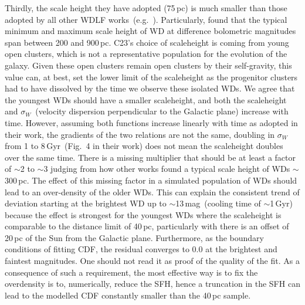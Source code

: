 \documentclass[fleqn,usenatbib]{mnras}
\begin{document}
Thirdly, the scale height they have adopted (75\,pc) is much smaller than those
adopted by all other WDLF works~(e.g.\ \citealt{2006AJ....131..571H,
2011MNRAS.417...93R, 2019MNRAS.482..715L}). Particularly,
\citet{2006AJ....131..571H} found that the typical minimum and maximum scale
height of WD at difference bolometric magnitudes span between 200 and 900\,pc.
C23's choice of scaleheight is coming from young open clusters, which is not
a representative population for the evolution of the galaxy. Given these open
clusters remain open clusters by their self-gravity, this value can, at best,
set the lower limit of the scaleheight as the progenitor clusters had to have
dissolved by the time we observe these isolated WDs. We agree that the youngest
WDs should have a smaller scaleheight, and both the scaleheight and
$\sigma_W$~(velocity dispersion perpendicular to the Galactic plane) increase
with time. However, assuming both functions increase linearly with time as
adopted in their work, the gradients of the two relations are not the same,
doubling in $\sigma_W$ from 1 to 8\,Gyr~(Fig.~4 in their work) does not mean
the scaleheight doubles over the same time. There is a missing multiplier
that should be at least a factor of $\sim$2 to $\sim$3 judging from how other 
works found a typical scale height of WDs $\sim$300\,pc. The effect of this 
missing factor in a simulated population of WDs should lead to an over-density
of the older WDs. This can explain the consistent trend of deviation starting
at the brightest WD up to $\sim$13\,mag~(cooling time of $\sim$1\,Gyr) because
the effect is strongest for the youngest WDs where the scaleheight is
comparable to the distance limit of 40\,pc, particularly with there is an
offset of 20\,pc of the Sun from the Galactic plane. Furthermore, as the
boundary conditions of fitting CDF, the residual converges to 0.0 at the
brightest and faintest magnitudes. One should not read it as proof of the
quality of the fit. As a consequence of such a requirement, the most effective
way is to fix the overdensity is to, numerically, reduce the SFH, hence a
truncation in the SFH can lead to the modelled CDF constantly smaller than the
40\,pc sample.


\citet{2019ApJ...878L..11I, 2021MNRAS.502.1753T}
\end{document}
